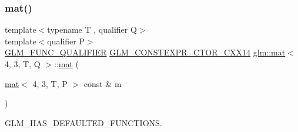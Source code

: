 \mbox{\label{structglm_1_1mat_3_014_00_013_00_01_t_00_01_q_01_4_a313800de73dd26da692bec90ff24ad42}} 
\subsubsection{\texorpdfstring{mat()}{mat()}\hspace{0.1cm}{\footnotesize\ttfamily [18/21]}}
{\footnotesize\ttfamily template$<$typename T , qualifier Q$>$ \\
template$<$qualifier P$>$ \\
\hyperlink{setup_8hpp_a33fdea6f91c5f834105f7415e2a64407}{G\+L\+M\+\_\+\+F\+U\+N\+C\+\_\+\+Q\+U\+A\+L\+I\+F\+I\+ER} \hyperlink{setup_8hpp_a0900f9145e68bf6061b6f5e7be3fa751}{G\+L\+M\+\_\+\+C\+O\+N\+S\+T\+E\+X\+P\+R\+\_\+\+C\+T\+O\+R\+\_\+\+C\+X\+X14} \hyperlink{structglm_1_1mat}{glm\+::mat}$<$ 4, 3, T, Q $>$\+::\hyperlink{structglm_1_1mat}{mat} (\begin{DoxyParamCaption}\item[{\hyperlink{structglm_1_1mat}{mat}$<$ 4, 3, T, P $>$ const \&}]{m }\end{DoxyParamCaption})}



G\+L\+M\+\_\+\+H\+A\+S\+\_\+\+D\+E\+F\+A\+U\+L\+T\+E\+D\+\_\+\+F\+U\+N\+C\+T\+I\+O\+NS. 

\mbox{\label{structglm_1_1mat_3_014_00_013_00_01_t_00_01_q_01_4_a97ef5af99c1162296ecfe810c2d8a4b1}} 

